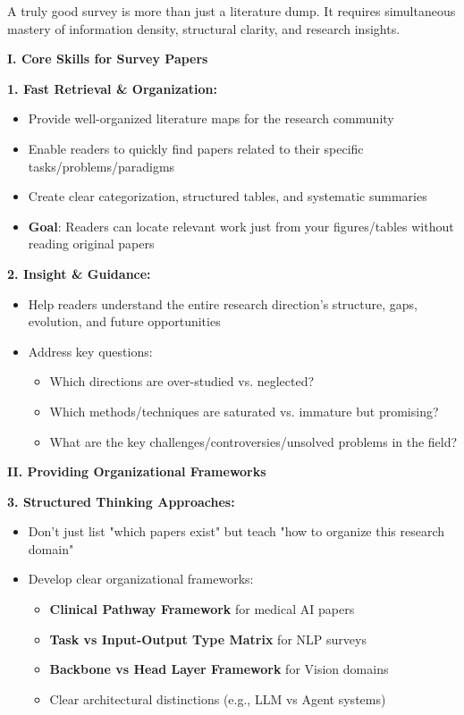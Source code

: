 \documentclass[11pt,a4paper]{article}
\begin{document}
\begin{tcolorbox}[colback=green!5,colframe=green!50,title=The Value of Survey Papers]
A truly good survey is more than just a literature dump. It requires simultaneous mastery of information density, structural clarity, and research insights.
\end{tcolorbox}

\textbf{I. Core Skills for Survey Papers}

\textbf{1. Fast Retrieval \& Organization:}
\begin{itemize}
    \item Provide well-organized literature maps for the research community
    \item Enable readers to quickly find papers related to their specific tasks/problems/paradigms
    \item Create clear categorization, structured tables, and systematic summaries
    \item \textbf{Goal}: Readers can locate relevant work just from your figures/tables without reading original papers
\end{itemize}

\textbf{2. Insight \& Guidance:}
\begin{itemize}
    \item Help readers understand the entire research direction's structure, gaps, evolution, and future opportunities
    \item Address key questions:
    \begin{itemize}
        \item Which directions are over-studied vs. neglected?
        \item Which methods/techniques are saturated vs. immature but promising?
        \item What are the key challenges/controversies/unsolved problems in the field?
    \end{itemize}
\end{itemize}

\textbf{II. Providing Organizational Frameworks}

\textbf{3. Structured Thinking Approaches:}
\begin{itemize}
    \item Don't just list "which papers exist" but teach "how to organize this research domain"
    \item Develop clear organizational frameworks:
    \begin{itemize}
        \item \textbf{Clinical Pathway Framework} for medical AI papers
        \item \textbf{Task vs Input-Output Type Matrix} for NLP surveys
        \item \textbf{Backbone vs Head Layer Framework} for Vision domains
        \item Clear architectural distinctions (e.g., LLM vs Agent systems)
    \end{itemize}
\end{itemize}
\end{document}
